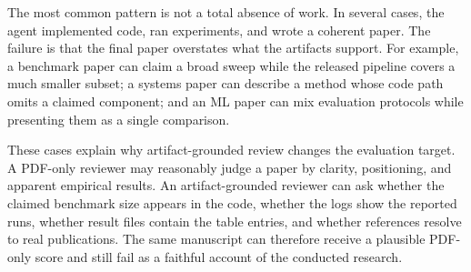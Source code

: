 The most common pattern is not a total absence of work. In several cases, the agent implemented code, ran experiments, and wrote a coherent paper. The failure is that the final paper overstates what the artifacts support. For example, a benchmark paper can claim a broad sweep while the released pipeline covers a much smaller subset; a systems paper can describe a method whose code path omits a claimed component; and an ML paper can mix evaluation protocols while presenting them as a single comparison.

These cases explain why artifact-grounded review changes the evaluation target. A PDF-only reviewer may reasonably judge a paper by clarity, positioning, and apparent empirical results. An artifact-grounded reviewer can ask whether the claimed benchmark size appears in the code, whether the logs show the reported runs, whether result files contain the table entries, and whether references resolve to real publications. The same manuscript can therefore receive a plausible PDF-only score and still fail as a faithful account of the conducted research.
